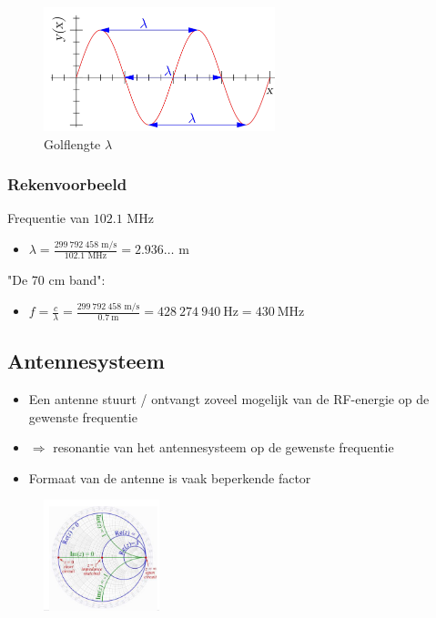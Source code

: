 \documentclass{article}
\begin{document}
\begin{figure}[H]
    \centering
    \includegraphics[width=0.6\textwidth]{Screenshot_20200309_121003.png}
    \caption{Golflengte $\lambda$}
\end{figure}

\subsubsection{Rekenvoorbeeld}
Frequentie van $102.1\text{ MHz}$
\begin{itemize}
    \item $\lambda = \frac{299\ 792\ 458 \text{ m/s}}{102.1\text{ MHz}} = 2.936\dots \text{ m}$
\end{itemize}
"De 70 cm band":
\begin{itemize}
    \item $f = \frac{c}{\lambda} = \frac{299\ 792\ 458 \text{ m/s}}{0.7\ \text{m}} =  428\ 274\ 940\ \text{Hz} = 430\ \text{MHz}$
\end{itemize}

\subsection{Antennesysteem}
\begin{itemize}
    \item Een antenne stuurt / ontvangt zoveel mogelijk van de RF-energie op de gewenste frequentie
    \item $\Rightarrow$ resonantie van het antennesysteem op de gewenste frequentie
    \item Formaat van de antenne is vaak beperkende factor 
\end{itemize}

\begin{figure}[H]
    \centering
    \includegraphics[width=0.3\textwidth]{Screenshot_20200309_122045.png}
    \caption{}
\end{figure}
\end{document}
